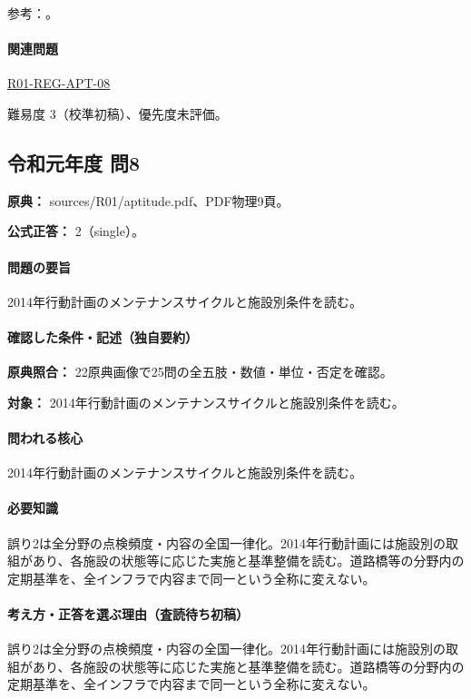 \par 参考：\cite{eng52_infra2014,eng52_adopt}。

\paragraph{関連問題} \hyperref[q:r01-reg-apt-08]{R01-REG-APT-08}

\par 難易度 3（校準初稿）、優先度未評価。

\subsection{令和元年度 問8}
\label{q:r01-reg-apt-08}

\noindent\textbf{原典：} sources/R01/aptitude.pdf、PDF物理9頁。

\textbf{公式正答：} 2（single）。

\paragraph{問題の要旨} 2014年行動計画のメンテナンスサイクルと施設別条件を読む。

\paragraph{確認した条件・記述（独自要約）}\mbox{}\par

\noindent\textbf{原典照合：} 22原典画像で25問の全五肢・数値・単位・否定を確認。\par

\noindent\textbf{対象：} 2014年行動計画のメンテナンスサイクルと施設別条件を読む。\par

\paragraph{問われる核心} 2014年行動計画のメンテナンスサイクルと施設別条件を読む。

\paragraph{必要知識} 誤り2は全分野の点検頻度・内容の全国一律化。2014年行動計画には施設別の取組があり、各施設の状態等に応じた実施と基準整備を読む。道路橋等の分野内の定期基準を、全インフラで内容まで同一という全称に変えない。

\paragraph{考え方・正答を選ぶ理由（査読待ち初稿）} 誤り2は全分野の点検頻度・内容の全国一律化。2014年行動計画には施設別の取組があり、各施設の状態等に応じた実施と基準整備を読む。道路橋等の分野内の定期基準を、全インフラで内容まで同一という全称に変えない。

